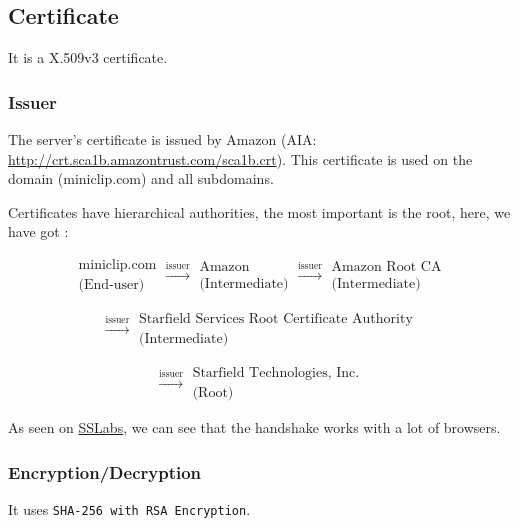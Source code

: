 \documentclass{article}
\begin{document}
\subsection{Certificate}
\label{sub:certificate}

It is a X.509v3 certificate.

\subsubsection{Issuer}
The server's certificate is issued by Amazon (AIA: \url{http://crt.sca1b.amazontrust.com/sca1b.crt}). This certificate is used on the domain (miniclip.com) and all subdomains.

Certificates have hierarchical authorities, the most important is the root, here, we have got :

\[
    \begin{array}{c}
        \text{miniclip.com}\\\text{(End-user)}
    \end{array}
    \xrightarrow[]{\text{issuer}}
    \begin{array}{c}
        \text{Amazon}\\\text{(Intermediate)}
    \end{array}
    \xrightarrow[]{\text{issuer}}
    \begin{array}{c}
        \text{Amazon Root CA}\\\text{(Intermediate)}
    \end{array}
\]

\[    
    \xrightarrow[]{\text{issuer}}
    \begin{array}{c}
        \text{Starfield Services Root Certificate Authority}\\\text{(Intermediate)}
    \end{array}
\]

\[     
    \xrightarrow[]{\text{issuer}}
    \begin{array}{c}
        \text{Starfield Technologies, Inc.}\\\text{(Root)}
    \end{array}
\]

As seen on \href{https://www.ssllabs.com/ssltest/analyze.html?d=miniclip.com&s=99.84.224.21}{SSLabs}, we can see that the handshake works with a lot of browsers.


\subsubsection{Encryption/Decryption}
It uses \texttt{SHA-256 with RSA Encryption}.
\end{document}

